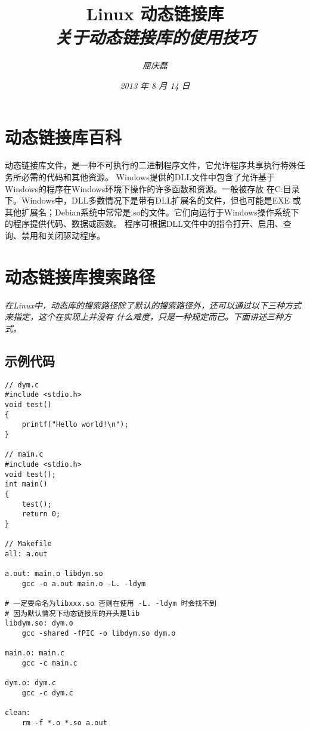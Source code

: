 \documentclass{article}
\begin{document}
\title{%
  {\huge \textsf{Linux 动态链接库}\\\smallskip}%
  {\small \textit{关于动态链接库的使用技巧}}
}

\author{\textit{屈庆磊}\\[2mm]
       }

\date{\textit{2013 年 8 月 14 日}}

\maketitle
\begin{multicols}{2}
\tableofcontents
\end{multicols}

\section{动态链接库百科}
动态链接库文件，是一种不可执行的二进制程序文件，它允许程序共享执行特殊任务所必需的代码和其他资源。
Windows提供的DLL文件中包含了允许基于Windows的程序在Windows环境下操作的许多函数和资源。一般被存放
在C:目录下。Windows中，DLL多数情况下是带有DLL扩展名的文件，但也可能是EXE
或其他扩展名；Debian系统中常常是.so的文件。它们向运行于Windows操作系统下的程序提供代码、数据或函数。
程序可根据DLL文件中的指令打开、启用、查询、禁用和关闭驱动程序。

\section{动态链接库搜索路径}
\textit{
在Linux中，动态库的搜索路径除了默认的搜索路径外，还可以通过以下三种方式来指定，这个在实现上并没有
什么难度，只是一种规定而已。下面讲述三种方式。
}

\subsection{示例代码}
\begin{verbatim}
// dym.c
#include <stdio.h>
void test()
{
	printf("Hello world!\n");
}

// main.c
#include <stdio.h>
void test();
int main()
{
	test();
	return 0;
}

// Makefile
all: a.out

a.out: main.o libdym.so
	gcc -o a.out main.o -L. -ldym

# 一定要命名为libxxx.so 否则在使用 -L. -ldym 时会找不到
# 因为默认情况下动态链接库的开头是lib
libdym.so: dym.o
	gcc -shared -fPIC -o libdym.so dym.o

main.o: main.c
	gcc -c main.c

dym.o: dym.c
	gcc -c dym.c

clean: 
	rm -f *.o *.so a.out
\end{verbatim}
\end{document}
